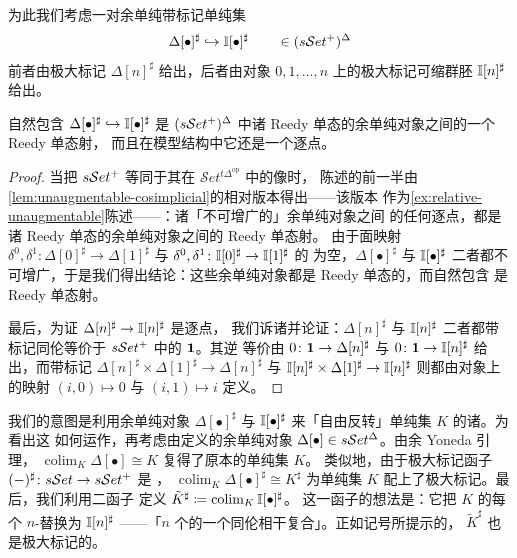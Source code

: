 为此我们考虑一对余单纯带标记单纯集
\[
\Delta[\bullet]^{\sharp}\hookrightarrow\mathbb{I}[\bullet]^{\sharp}
\qquad\in(s\mathcal{S}et^{+})^{\Delta}
\]
前者由极大标记\trSimplex{} $\Delta[n]^{\sharp}$ 给出，后者由对象
$0,1,\dots,n$ 上的极大标记可缩群胚 $\mathbb{I}[n]^{\sharp}$ 给出。

\begin{lemma}\label{lem:natural-marking-reedy}
自然包含 $\Delta[\bullet]^{\sharp}\hookrightarrow\mathbb{I}[\bullet]^{\sharp}$ 是
$(s\mathcal{S}et^{+})^{\Delta}$ 中诸 Reedy 单态的余单纯对象之间的一个 Reedy 单态射，
而且在\trVerity{}模型结构中它还是一个逐点\trWeakEquivalence。
\end{lemma}

\begin{proof}
当把 $s\mathcal{S}et^{+}$ 等同于其在 $\mathcal{S}et^{t\Delta^{\mathrm{op}}}$ 中的像时，
陈述的前一半由\cref{lem:unaugmentable-cosimplicial}的相对版本得出——该版本
作为\cref{ex:relative-unaugmentable}陈述——：诸「不可增广的」余单纯对象之间
的任何逐点\trMonomorphism，都是诸 Reedy 单态的余单纯对象之间的 Reedy 单态射。
由于面映射 $\delta^{0},\delta^{1}\colon\Delta[0]^{\sharp}\to\Delta[1]^{\sharp}$
与 $\delta^{0},\delta^{1}\colon\mathbb{I}[0]^{\sharp}\to\mathbb{I}[1]^{\sharp}$ 的%
\trEqualizer{}为空，$\Delta[\bullet]^{\sharp}$ 与 $\mathbb{I}[\bullet]^{\sharp}$
二者都不可增广，于是我们得出结论：这些余单纯对象都是 Reedy 单态的，而自然包含
是 Reedy 单态射。

最后，为证 $\Delta[n]^{\sharp}\to\mathbb{I}[n]^{\sharp}$ 是逐点\trWeakEquivalence，
我们诉诸\trTwoOfThreeProperty{}并论证：$\Delta[n]^{\sharp}$ 与
$\mathbb{I}[n]^{\sharp}$ 二者都带标记同伦等价于 $s\mathcal{S}et^{+}$ 中的 $\mathbf{1}$。其逆
等价由 $0\colon\mathbf{1}\to\Delta[n]^{\sharp}$ 与
$0\colon\mathbf{1}\to\mathbb{I}[n]^{\sharp}$ 给出，而带标记\trHomotopy{}
$\Delta[n]^{\sharp}\times\Delta[1]^{\sharp}\to\Delta[n]^{\sharp}$ 与
$\mathbb{I}[n]^{\sharp}\times\Delta[1]^{\sharp}\to\mathbb{I}[n]^{\sharp}$ 则都由对象上
的映射 $(i,0)\mapsto 0$ 与 $(i,1)\mapsto i$ 定义。
\end{proof}

我们的意图是利用余单纯对象 $\Delta[\bullet]^{\sharp}$ 与
$\mathbb{I}[\bullet]^{\sharp}$ 来「自由反转」单纯集 $K$ 的诸\trSimplex。为看出这
如何运作，再考虑由\trYonedaEmbedding{}定义的余单纯对象
$\Delta[\bullet]\in s\mathcal{S}et^{\Delta}$。由余 Yoneda 引理，\trWeightedColimit
$\operatorname{colim}_{K}\Delta[\bullet]\cong K$ 复得了原本的单纯集 $K$。
类似地，由于极大标记函子 $(-)^{\sharp}\colon s\mathcal{S}et\to s\mathcal{S}et^{+}$ 是%
\trLeftAdjoint，\trWeightedColimit{} $\operatorname{colim}_{K}\Delta[\bullet]^{\sharp}\cong K^{\sharp}$ 为单纯集 $K$ 配上了极大标记。最后，我们利用\trWeightedColimit{}二函子
定义 $\tilde{K}^{\sharp}\coloneqq\operatorname{colim}_{K}\mathbb{I}[\bullet]^{\sharp}$。
这一函子的想法是：它把 $K$ 的每个 $n$-\trSimplex{}替换为 $\mathbb{I}[n]^{\sharp}$
——「$n$ 个\trIsomorphism{}的一个同伦相干复合」。正如记号所提示的，
$\tilde{K}^{\sharp}$ 也是极大标记的。

